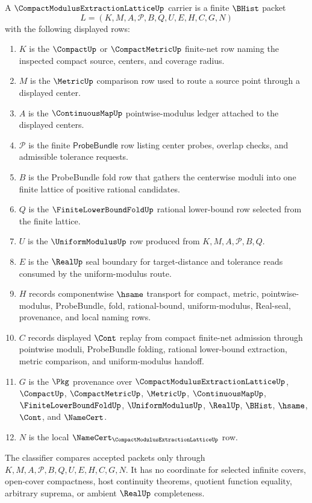 \begin{definition}
\label{def:compact-modulus-extraction-lattice-carrier}
A $\CompactModulusExtractionLatticeUp$ carrier is a finite $\BHist$ packet
$$
L=(K,M,A,\mathcal{P},B,Q,U,E,H,C,G,N)
$$
with the following displayed rows:
\begin{enumerate}
\item $K$ is the $\CompactUp$ or $\CompactMetricUp$ finite-net row naming the inspected compact source, centers, and coverage radius.
\item $M$ is the $\MetricUp$ comparison row used to route a source point through a displayed center.
\item $A$ is the $\ContinuousMapUp$ pointwise-modulus ledger attached to the displayed centers.
\item $\mathcal{P}$ is the finite $\mathsf{ProbeBundle}$ row listing center probes, overlap checks, and admissible tolerance requests.
\item $B$ is the ProbeBundle fold row that gathers the centerwise moduli into one finite lattice of positive rational candidates.
\item $Q$ is the $\FiniteLowerBoundFoldUp$ rational lower-bound row selected from the finite lattice.
\item $U$ is the $\UniformModulusUp$ row produced from $K,M,A,\mathcal{P},B,Q$.
\item $E$ is the $\RealUp$ seal boundary for target-distance and tolerance reads consumed by the uniform-modulus route.
\item $H$ records componentwise $\hsame$ transport for compact, metric, pointwise-modulus, ProbeBundle, fold, rational-bound, uniform-modulus, Real-seal, provenance, and local naming rows.
\item $C$ records displayed $\Cont$ replay from compact finite-net admission through pointwise moduli, ProbeBundle folding, rational lower-bound extraction, metric comparison, and uniform-modulus handoff.
\item $G$ is the $\Pkg$ provenance over $\CompactModulusExtractionLatticeUp$, $\CompactUp$, $\CompactMetricUp$, $\MetricUp$, $\ContinuousMapUp$, $\FiniteLowerBoundFoldUp$, $\UniformModulusUp$, $\RealUp$, $\BHist$, $\hsame$, $\Cont$, and $\NameCert$.
\item $N$ is the local $\NameCert_{\CompactModulusExtractionLatticeUp}$ row.
\end{enumerate}
The classifier compares accepted packets only through $K,M,A,\mathcal{P},B,Q,U,E,H,C,G,N$. It has no coordinate for selected infinite covers, open-cover compactness, host continuity theorems, quotient function equality, arbitrary suprema, or ambient $\RealUp$ completeness.
\end{definition}

